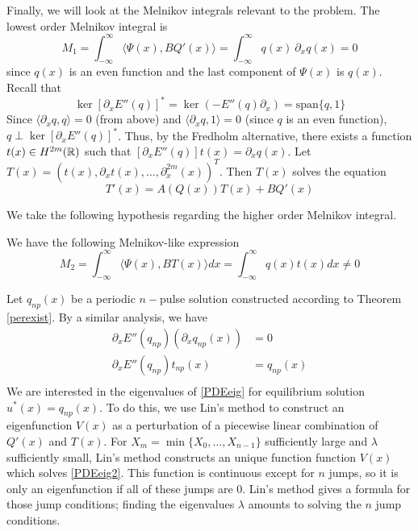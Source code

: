 \documentclass[thesis.tex]{subfiles}
\begin{document}
Finally, we will look at the Melnikov integrals relevant to the problem. The lowest order Melnikov integral is
\begin{equation}\label{M1}
M_1 = \int_{-\infty}^\infty \langle \Psi(x), B Q'(x) \rangle =
\int_{-\infty}^\infty q(x) \: \partial_x q(x) = 0
\end{equation}
since $q(x)$ is an even function and the last component of $\Psi(x)$ is $q(x)$. Recall that 
\[
\ker [\partial_x E''(q)]^* = \ker(-E''(q) \partial_x) = 
\text{span}\{ q, 1 \}
\]
Since $\langle \partial_x q, q \rangle = 0$ (from above) and $\langle \partial_x q, 1 \rangle = 0$ (since $q$ is an even function), $q \perp \ker [\partial_x E''(q)]^*$. Thus, by the Fredholm alternative, there exists a function $t(x) \in H^{2m}({\mathbb R})$ such that $[ \partial_x E''(q) ]t(x) = \partial_x q(x)$. Let $T(x) = (t(x), \partial_x t(x), \dots, \partial_x^{2m}(x))^T$. Then $T(x)$ solves the equation
\begin{equation}\label{eqforT}
T'(x) = A(Q(x))T(x) + B Q'(x)
\end{equation}

We take the following hypothesis regarding the higher order Melnikov integral.
\begin{hypothesis}\label{Melnikov2hyp}
We have the following Melnikov-like expression
\begin{equation}\label{M2}
M_2 = \int_{-\infty}^\infty \langle \Psi(x), B T(x) \rangle dx =
\int_{-\infty}^\infty q(x) t(x) dx \neq 0
\end{equation}
\end{hypothesis}

Let $q_{np}(x)$ be a periodic $n-$pulse solution constructed according to Theorem \ref{perexist}. By a similar analysis, we have
\begin{align*}
\partial_x E''(q_{np}) (\partial_x q_{np}(x)) &= 0 \\
\partial_x E''(q_{np}) t_{np}(x) &= q_{np}(x) \\
\end{align*}
We are interested in the eigenvalues of \eqref{PDEeig} for equilibrium solution $u^*(x) = q_{np}(x)$. To do this, we use Lin's method to construct an eigenfunction $V(x)$ as a perturbation of a piecewise linear combination of $Q'(x)$ and $T(x)$. For $X_m = \min\{X_0, \dots, X_{n-1} \}$ sufficiently large and $\lambda$ sufficiently small, Lin's method constructs an unique function function $V(x)$ which solves \eqref{PDEeig2}. This function is continuous except for $n$ jumps, so it is only an eigenfunction if all of these jumps are 0. Lin's method gives a formula for those jump conditions; finding the eigenvalues $\lambda$ amounts to solving the $n$ jump conditions.
\end{document}

